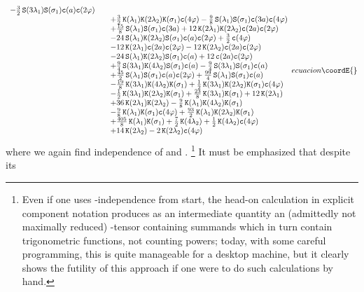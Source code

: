 \documentclass[a4paper,12pt]{article}
\begin{document}
\begin{equation}
{\begin{array}{lll}
-\frac{3}{2}\,\sinhx{3 \lambda_1} \sinhx{ \sigma_1} \cosx{a} \cosx{2 \varphi}\\
&&+\frac{3}{2}\,\coshx{ \lambda_1} \coshx{2 \lambda_2} \coshx{ \sigma_1} \cosx{4 \varphi}
-\frac{9}{8}\,\sinhx{ \lambda_1} \sinhx{ \sigma_1} \cosx{3 a} \cosx{4 \varphi}\\
&&+\frac{15}{8}\,\sinhx{ \lambda_1} \sinhx{ \sigma_1} \cosx{3 a}
+12\,\coshx{2 \lambda_1} \coshx{2 \lambda_2} \cosx{2 a} \cosx{2 \varphi}\\
&&-24\,\sinhx{ \lambda_1} \coshx{2 \lambda_2} \sinhx{ \sigma_1} \cosx{a} \cosx{2 \varphi}
+\frac{3}{2}\,\cosx{4 \varphi}\\
&&-12\,\coshx{2 \lambda_1} \cosx{2 a} \cosx{2 \varphi}
-12\,\coshx{2 \lambda_2} \cosx{2 a} \cosx{2 \varphi}\\
&&-24\,\sinhx{ \lambda_1} \coshx{2 \lambda_2} \sinhx{ \sigma_1} \cosx{a}
+12\,\cosx{2 a} \cosx{2 \varphi}\\
&&+\frac{9}{4}\,\sinhx{3 \lambda_1} \coshx{4 \lambda_2} \sinhx{ \sigma_1} \cosx{a}
-\frac{9}{4}\,\sinhx{3 \lambda_1} \sinhx{ \sigma_1} \cosx{a}\\
&&+\frac{45}{2}\,\sinhx{ \lambda_1} \sinhx{ \sigma_1} \cosx{a} \cosx{2 \varphi}
+\frac{99}{4}\,\sinhx{ \lambda_1} \sinhx{ \sigma_1} \cosx{a}\\
&&-\frac{19}{8}\,\coshx{3 \lambda_1} \coshx{4 \lambda_2} \coshx{ \sigma_1}
+\frac{1}{2}\,\coshx{3 \lambda_1} \coshx{2 \lambda_2} \coshx{ \sigma_1} \cosx{4 \varphi}\\
&&-\frac{1}{2}\,\coshx{3 \lambda_1} \coshx{2 \lambda_2} \coshx{ \sigma_1}
+\frac{23}{8}\,\coshx{3 \lambda_1} \coshx{ \sigma_1}
+12\,\coshx{2 \lambda_1}\\
&&+36\,\coshx{2 \lambda_1} \coshx{2 \lambda_2}
-\frac{9}{8}\,\coshx{ \lambda_1} \coshx{4 \lambda_2} \coshx{ \sigma_1}\\
&&-\frac{9}{8}\,\coshx{ \lambda_1} \coshx{ \sigma_1} \cosx{4 \varphi}
+\frac{93}{2}\,\coshx{ \lambda_1} \coshx{2 \lambda_2} \coshx{ \sigma_1}\\
&&+\frac{405}{8}\,\coshx{ \lambda_1} \coshx{ \sigma_1}
+\frac{7}{2}\,\coshx{4 \lambda_2}
+\frac{1}{2}\,\coshx{4 \lambda_2} \cosx{4 \varphi}\\
&&+14\,\coshx{2 \lambda_2}
-2\,\coshx{2 \lambda_2} \cosx{4 \varphi}
\end{array}
}{ecuacion}\coordE{}\end{equation}
%
where we again find independence of \myHighlight{$\vartheta$}\coordHE{} and \myHighlight{$\Psi$}\coordHE{}.%
\footnote{Even if one uses \myHighlight{$\vartheta,\Psi$}\coordHE{}-independence from start,
the head-on calculation in explicit component notation produces as an
intermediate quantity an (admittedly not maximally reduced) \coordHE{}-tensor
containing \coordHE{} summands which in turn contain \coordHE{}
trigonometric functions, not counting powers; today, with some careful
programming, this is quite manageable for a desktop machine, but it
clearly shows the futility of this approach if one were to do such
calculations by hand.}  It must be emphasized that despite its
\end{document}
